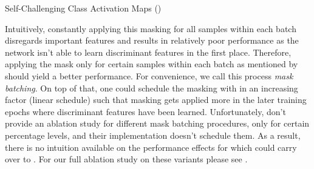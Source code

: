 \begin{algorithm}[t]
    \SetAlgoLined
    \SetNoFillComment
    \BlankLine
\caption{Self-Challenging Class Activation Maps (\scam)}
\label{alg:ActivationMasking}
\end{algorithm}

Intuitively, constantly applying this masking for all samples within each batch disregards important features and results in relatively poor performance as the network isn't able to learn discriminant features in the first place. Therefore, applying the mask only for certain samples within each batch as mentioned by \citet[Secton~3.3]{huang2020selfchallenging} should yield a better performance. For convenience, we call this process \emph{mask batching}. On top of that, one could schedule the masking with in an increasing factor (\eg linear schedule) such that masking gets applied more in the later training epochs where discriminant features have been learned. Unfortunately, \citet{huang2020selfchallenging} don't provide an ablation study for different mask batching procedures, only for certain percentage levels, and their implementation doesn't schedule them. As a result, there is no intuition available on the performance effects for \rsc which could carry over to \scam. For our full ablation study on these \scam variants please see .

